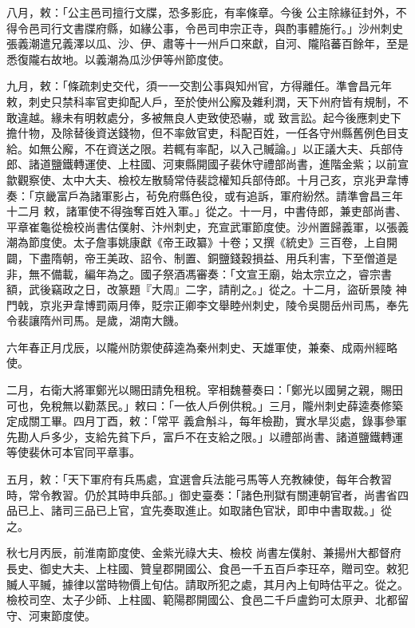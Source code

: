 \begin{pinyinscope}
 八月，敕：「公主邑司擅行文牒，恐多影庇，有率條章。今後
 公主除緣征封外，不得令邑司行文書牒府縣，如緣公事，令邑司申宗正寺，與酌事體施行。」沙州刺史張義潮遣兄義澤以瓜、沙、伊、肅等十一州戶口來獻，自河、隴陷蕃百餘年，至是悉復隴右故地。以義潮為瓜沙伊等州節度使。



 九月，敕：「條疏刺史交代，須一一交割公事與知州官，方得離任。準會昌元年敕，刺史只禁科率官吏抑配人戶，至於使州公廨及雜利潤，天下州府皆有規制，不敢違越。緣未有明敕處分，多被無良人吏致使恐嚇，或
 致言訟。起今後應刺史下擔什物，及除替後資送錢物，但不率斂官吏，科配百姓，一任各守州縣舊例色目支給。如無公廨，不在資送之限。若輒有率配，以入己贓論。」以正議大夫、兵部侍郎、諸道鹽鐵轉運使、上柱國、河東縣開國子裴休守禮部尚書，進階金紫；以前宣歙觀察使、太中大夫、檢校左散騎常侍裴諗權知兵部侍郎。十月己亥，京兆尹韋博奏：「京畿富戶為諸軍影占，茍免府縣色役，或有追訴，軍府紛然。請準會昌三年十二月
 敕，諸軍使不得強奪百姓入軍。」從之。十一月，中書侍郎，兼吏部尚書、平章崔龜從檢校尚書估僕射、汴州刺史，充宣武軍節度使。沙州置歸義軍，以張義潮為節度使。太子詹事姚康獻《帝王政纂》十卷；又撰《統史》三百卷，上自開闢，下盡隋朝，帝王美政、詔令、制置、銅鹽錢穀損益、用兵利害，下至僧道是非，無不備載，編年為之。國子祭酒馮審奏：「文宣王廟，始太宗立之，睿宗書額，武後竊政之日，改篆題『大周』二字，請削之。」從之。十二月，盜斫景陵
 神門戟，京兆尹韋博罰兩月俸，貶宗正卿李文舉睦州刺史，陵令吳閱岳州司馬，奉先令裴讓隋州司馬。是歲，湖南大饑。



 六年春正月戊辰，以隴州防禦使薛逵為秦州刺史、天雄軍使，兼秦、成兩州經略使。



 二月，右衛大將軍鄭光以賜田請免租稅。宰相魏謩奏曰：「鄭光以國舅之親，賜田可也，免稅無以勸蒸民。」敕曰：「一依人戶例供稅。」三月，隴州刺史薛逵奏修築定成關工畢。四月丁酉，敕：「常平
 義倉斛斗，每年檢勘，實水旱災處，錄事參軍先勘人戶多少，支給先貧下戶，富戶不在支給之限。」以禮部尚書、諸道鹽鐵轉運等使裴休可本官同平章事。



 五月，敕：「天下軍府有兵馬處，宜選會兵法能弓馬等人充教練使，每年合教習時，常令教習。仍於其時申兵部。」御史臺奏：「諸色刑獄有關連朝官者，尚書省四品已上、諸司三品已上官，宜先奏取進止。如取諸色官狀，即申中書取裁。」從之。



 秋七月丙辰，前淮南節度使、金紫光祿大夫、檢校
 尚書左僕射、兼揚州大都督府長史、御史大夫、上柱國、贊皇郡開國公、食邑一千五百戶李玨卒，贈司空。敕犯贓人平贓，據律以當時物價上旬估。請取所犯之處，其月內上旬時估平之。從之。檢校司空、太子少師、上柱國、範陽郡開國公、食邑二千戶盧鈞可太原尹、北都留守、河東節度使。




\end{pinyinscope}
